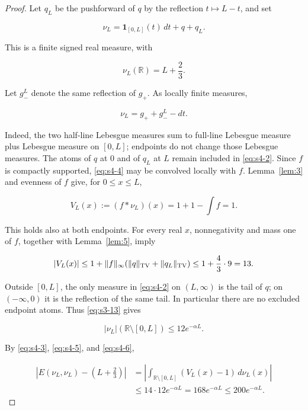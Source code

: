 \documentclass[10pt]{article}
\numberwithin{equation}{section}
\theoremstyle{remark}
\begin{document}
\begin{proof} Let \(q_L\) be the pushforward of \(q\) by the reflection
\(t\mapsto L-t\), and set

\begin{equation}
\nu_L=\mathbf1_{[0,L]}(t)\,dt+q+q_L.
\label{eq:s4-2}
\end{equation}

This is a finite signed real measure, with

\begin{equation}
\nu_L(\mathbb R)=L+\frac23.
\label{eq:s4-3}
\end{equation}

Let \(g_-^L\) denote the same reflection of \(g_+\). As locally finite
measures,

\begin{equation}
\nu_L=g_++g_-^L-dt.
\label{eq:s4-4}
\end{equation}

Indeed, the two half-line Lebesgue measures sum to full-line Lebesgue
measure plus Lebesgue measure on \([0,L]\); endpoints do not change those
Lebesgue measures. The atoms of \(q\) at 0 and of \(q_L\) at \(L\) remain
included in \eqref{eq:s4-2}. Since \(f\) is compactly supported, \eqref{eq:s4-4} may be
convolved locally with \(f\). Lemma~\ref{lem:3} and evenness of \(f\) give, for
\(0\le x\le L\),

\begin{equation}
V_L(x):=(f*\nu_L)(x)=1+1-\int f=1.
\label{eq:s4-5}
\end{equation}

This holds also at both endpoints. For every real \(x\), nonnegativity
and mass one of \(f\), together with Lemma~\ref{lem:5}, imply

\begin{equation}
|V_L(x)|\le1+\|f\|_\infty
(\|q\|_{\rm TV}+\|q_L\|_{\rm TV})
\le1+\frac43\cdot9=13.
\label{eq:s4-6}
\end{equation}

Outside \([0,L]\), the only measure in \eqref{eq:s4-2} on \((L,\infty)\) is the
tail of \(q\); on \(( -\infty,0)\) it is the reflection of the same tail.
In particular there are no excluded endpoint atoms. Thus \eqref{eq:s3-13} gives

\[
|\nu_L|(\mathbb R\setminus[0,L])\le12e^{-\alpha L}.
\]

By \eqref{eq:s4-3}, \eqref{eq:s4-5}, and \eqref{eq:s4-6},

\begin{equation}
\begin{aligned}
\left|E(\nu_L,\nu_L)-\left(L+\frac23\right)\right|
&=\left|\int_{\mathbb R\setminus[0,L]}(V_L(x)-1)\,d\nu_L(x)\right|\\
&\le14\cdot12e^{-\alpha L}
=168e^{-\alpha L}
\le200e^{-\alpha L}.
\end{aligned}
\label{eq:s4-7}
\end{equation}


\end{proof}
\end{document}

